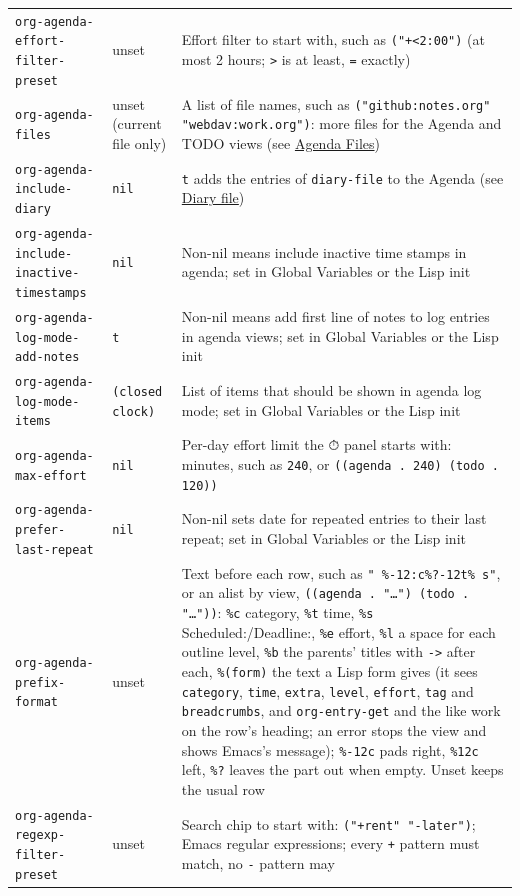 \documentclass[11pt]{article}
\begin{document}
\begin{center}
\begin{tabular}{lll}
\texttt{org-agenda-effort-filter-preset} & unset & Effort filter to start with, such as \texttt{("+<2:00")} (at most 2 hours; \texttt{>} is at least, \texttt{=} exactly)\\[0pt]
\texttt{org-agenda-files} & unset (current file only) & A list of file names, such as \texttt{("github:notes.org" "webdav:work.org")}: more files for the Agenda and TODO views (see \hyperref[sec:org4d24003]{Agenda Files})\\[0pt]
\texttt{org-agenda-include-diary} & \texttt{nil} & \texttt{t} adds the entries of \texttt{diary-file} to the Agenda (see \hyperref[sec:orgc7359b6]{Diary file})\\[0pt]
\texttt{org-agenda-include-inactive-timestamps} & \texttt{nil} & Non-nil means include inactive time stamps in agenda; set in Global Variables or the Lisp init\\[0pt]
\texttt{org-agenda-log-mode-add-notes} & \texttt{t} & Non-nil means add first line of notes to log entries in agenda views; set in Global Variables or the Lisp init\\[0pt]
\texttt{org-agenda-log-mode-items} & \texttt{(closed clock)} & List of items that should be shown in agenda log mode; set in Global Variables or the Lisp init\\[0pt]
\texttt{org-agenda-max-effort} & \texttt{nil} & Per-day effort limit the ⏱ panel starts with: minutes, such as \texttt{240}, or \texttt{((agenda . 240) (todo . 120))}\\[0pt]
\texttt{org-agenda-prefer-last-repeat} & \texttt{nil} & Non-nil sets date for repeated entries to their last repeat; set in Global Variables or the Lisp init\\[0pt]
\texttt{org-agenda-prefix-format} & unset & Text before each row, such as \texttt{"  \%-12:c\%?-12t\% s"}, or an alist by view, \texttt{((agenda . "…") (todo . "…"))}: \texttt{\%c} category, \texttt{\%t} time, \texttt{\%s} Scheduled:/Deadline:, \texttt{\%e} effort, \texttt{\%l} a space for each outline level, \texttt{\%b} the parents' titles with \texttt{->} after each, \texttt{\%(form)} the text a Lisp form gives (it sees \texttt{category}, \texttt{time}, \texttt{extra}, \texttt{level}, \texttt{effort}, \texttt{tag} and \texttt{breadcrumbs}, and \texttt{org-entry-get} and the like work on the row's heading; an error stops the view and shows Emacs's message); \texttt{\%-12c} pads right, \texttt{\%12c} left, \texttt{\%?} leaves the part out when empty. Unset keeps the usual row\\[0pt]
\texttt{org-agenda-regexp-filter-preset} & unset & Search chip to start with: \texttt{("+rent" "-later")}; Emacs regular expressions; every \texttt{+} pattern must match, no \texttt{-} pattern may\\[0pt]

\end{tabular}
\end{center}
\end{document}
